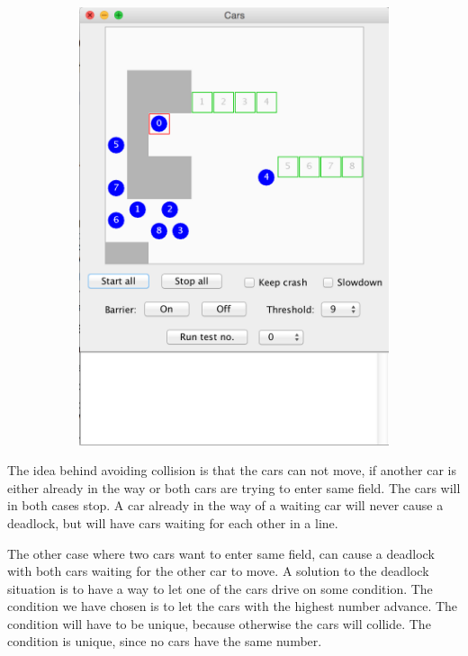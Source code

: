 \begin{figure}[H]
\begin{subfigure}[b]{0.4\textwidth}
\includegraphics[scale=0.3]{./graphics/Cars2.png}
\end{subfigure}
\end{figure}

The idea behind avoiding collision is that the cars can not move, if another car is either already in the way or both cars are trying to enter same field. The cars will in both cases stop. A car already in the way of a waiting car will never cause a deadlock, but will have cars waiting for each other in a line.

The other case where two cars want to enter same field, can cause a deadlock with both cars waiting for the other car to move. A solution to the deadlock situation is to have a way to let one of the cars drive on some condition. The condition we have chosen is to let the cars with the highest number advance. The condition will have to be unique, because otherwise the cars will collide. The condition is unique, since no cars have the same number.
\\

